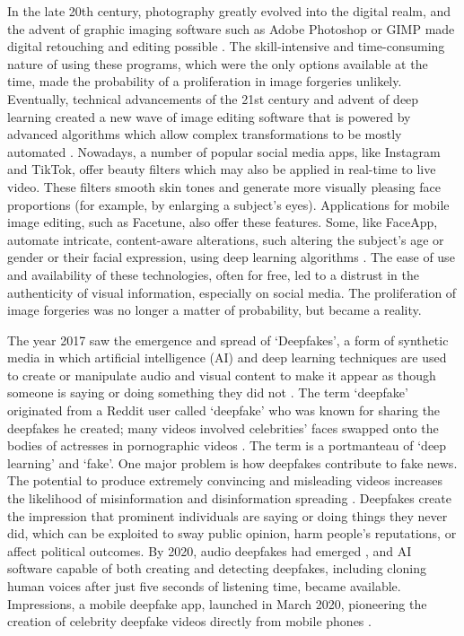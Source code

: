 In the late 20th century, photography greatly evolved into the digital realm, and the advent of graphic imaging software such as Adobe Photoshop or GIMP made digital retouching and editing possible \cite{Peres_2007}. The skill-intensive and time-consuming nature of using these programs, which were the only options available at the time, made the probability of a proliferation in image forgeries unlikely. Eventually, technical advancements of the 21st century and advent of deep learning created a new wave of image editing software that is powered by advanced algorithms which allow complex transformations to be mostly automated \cite{corcoran2014}. Nowadays, a number of popular social media apps, like Instagram and TikTok, offer beauty filters which may also be applied in real-time to live video. These filters smooth skin tones and generate more visually pleasing face proportions (for example, by enlarging a subject's eyes). Applications for mobile image editing, such as Facetune, also offer these features. Some, like FaceApp, automate intricate, content-aware alterations, such altering the subject's age or gender or their facial expression, using deep learning algorithms \cite{Vincent_2017}. The ease of use and availability of these technologies, often for free, led to a distrust in the authenticity of visual information, especially on social media.\cite{perez2021fake} The proliferation of image forgeries was no longer a matter of probability, but became a reality. 

The year 2017 saw the emergence and spread of `Deepfakes', a form of synthetic media in which artificial intelligence (AI) and deep learning techniques are used to create or manipulate audio and visual content to make it appear as though someone is saying or doing something they did not \cite{kietzmann2020deepfakes}. The term `deepfake' originated from a Reddit user called `deepfake' who was known for sharing the deepfakes he created; many videos involved celebrities' faces swapped onto the bodies of actresses in pornographic videos \cite{Cola_2018}. The term is a portmanteau of `deep learning' and `fake'. One major problem is how deepfakes contribute to fake news. The potential to produce extremely convincing and misleading videos increases the likelihood of misinformation and disinformation spreading \cite{Fallis_2020}. Deepfakes create the impression that prominent individuals are saying or doing things they never did, which can be exploited to sway public opinion, harm people's reputations, or affect political outcomes. By 2020, audio deepfakes had emerged \cite{muller2022human}, and AI software capable of both creating and detecting deepfakes, including cloning human voices after just five seconds of listening time, became available. Impressions, a mobile deepfake app, launched in March 2020, pioneering the creation of celebrity deepfake videos directly from mobile phones \cite{Mathews2020}.

